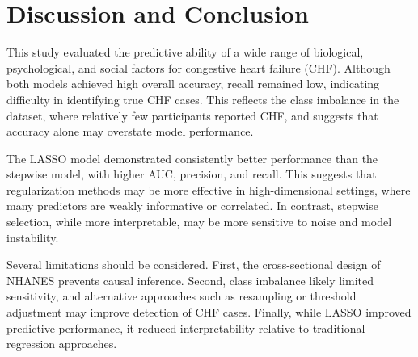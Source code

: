 \documentclass{article}
\begin{document}
\vspace{-6mm}
\section*{Discussion and Conclusion}
\vspace{-6mm}

This study evaluated the predictive ability of a wide range of biological, psychological, and social factors for congestive heart failure (CHF). Although both models achieved high overall accuracy, recall remained low, indicating difficulty in identifying true CHF cases. This reflects the class imbalance in the dataset, where relatively few participants reported CHF, and suggests that accuracy alone may overstate model performance.

The LASSO model demonstrated consistently better performance than the stepwise model, with higher AUC, precision, and recall. This suggests that regularization methods may be more effective in high-dimensional settings, where many predictors are weakly informative or correlated. In contrast, stepwise selection, while more interpretable, may be more sensitive to noise and model instability.

Several limitations should be considered. First, the cross-sectional design of NHANES prevents causal inference. Second, class imbalance likely limited sensitivity, and alternative approaches such as resampling or threshold adjustment may improve detection of CHF cases. Finally, while LASSO improved predictive performance, it reduced interpretability relative to traditional regression approaches.

\vspace{-1em}

\end{document}
